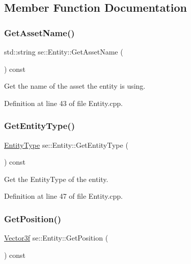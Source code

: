 \subsection{Member Function Documentation}
\mbox{\label{classse_1_1_entity_af1d512cba984ffe167decd7ecf7a88f4}} 
\subsubsection{\texorpdfstring{Get\+Asset\+Name()}{GetAssetName()}}
{\footnotesize\ttfamily std\+::string se\+::\+Entity\+::\+Get\+Asset\+Name (\begin{DoxyParamCaption}{ }\end{DoxyParamCaption}) const\hspace{0.3cm}{\ttfamily [virtual]}}

Get the name of the asset the entity is using. 

Definition at line 43 of file Entity.\+cpp.

\mbox{\label{classse_1_1_entity_aec26e9fd7f7c4c6d89e1e459a5eb028a}} 
\subsubsection{\texorpdfstring{Get\+Entity\+Type()}{GetEntityType()}}
{\footnotesize\ttfamily \mbox{\hyperlink{namespacese_ae73a909a94998bc95235eb9b16e405f1}{Entity\+Type}} se\+::\+Entity\+::\+Get\+Entity\+Type (\begin{DoxyParamCaption}{ }\end{DoxyParamCaption}) const\hspace{0.3cm}{\ttfamily [virtual]}}

Get the Entity\+Type of the entity. 

Definition at line 47 of file Entity.\+cpp.

\mbox{\label{classse_1_1_entity_a40f94e236b724c4e375ee51f923de475}} 
\subsubsection{\texorpdfstring{Get\+Position()}{GetPosition()}}
{\footnotesize\ttfamily \mbox{\hyperlink{namespacese_a12e07512d95e2fdebdaf74a5ea2cf5f6}{Vector3f}} se\+::\+Entity\+::\+Get\+Position (\begin{DoxyParamCaption}{ }\end{DoxyParamCaption}) const\hspace{0.3cm}{\ttfamily [virtual]}}


